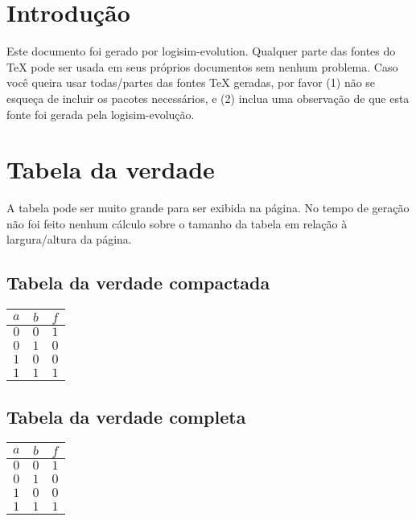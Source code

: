 \documentclass [15pt,a4paper,twoside]{article}
\begin{document}
\section{Introdução}
Este documento foi gerado por logisim-evolution. Qualquer parte das fontes do TeX pode ser usada em seus próprios documentos sem nenhum problema. Caso você queira usar todas/partes das fontes TeX geradas, por favor (1) não se esqueça de incluir os pacotes necessários, e (2) inclua uma observação de que esta fonte foi gerada pela logisim-evolução.
\section{Tabela da verdade}
A tabela pode ser muito grande para ser exibida na página. No tempo de geração não foi feito nenhum cálculo sobre o tamanho da tabela em relação à largura/altura da página.
\subsection{Tabela da verdade compactada}
\begin{center}
\begin{tabular}{cc|c}
$a$&$b$&$f$\\
\hline
$0$&$0$&$1$\\
$0$&$1$&$0$\\
$1$&$0$&$0$\\
$1$&$1$&$1$\\

\end{tabular}
\end{center}
\subsection{Tabela da verdade completa}
\begin{center}
\begin{tabular}{cc|c}
$a$&$b$&$f$\\
\hline
$0$&$0$&$1$\\
$0$&$1$&$0$\\
$1$&$0$&$0$\\
$1$&$1$&$1$\\

\end{tabular}
\end{center}
\end{document}
